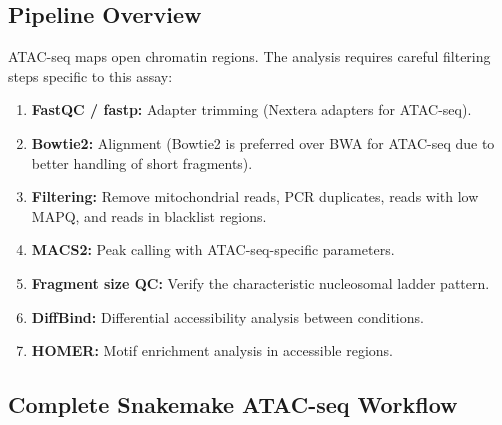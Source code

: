 \subsection{Pipeline Overview}

ATAC-seq maps open chromatin regions. The analysis requires careful filtering steps specific to this assay:

\begin{enumerate}[itemsep=2pt]
  \item \textbf{FastQC / fastp:} Adapter trimming (Nextera adapters for ATAC-seq).
  \item \textbf{Bowtie2:} Alignment (Bowtie2 is preferred over BWA for ATAC-seq due to better handling of short fragments).
  \item \textbf{Filtering:} Remove mitochondrial reads, PCR duplicates, reads with low MAPQ, and reads in blacklist regions.
  \item \textbf{MACS2:} Peak calling with ATAC-seq-specific parameters.
  \item \textbf{Fragment size QC:} Verify the characteristic nucleosomal ladder pattern.
  \item \textbf{DiffBind:} Differential accessibility analysis between conditions.
  \item \textbf{HOMER:} Motif enrichment analysis in accessible regions.
\end{enumerate}

\subsection{Complete Snakemake ATAC-seq Workflow}

